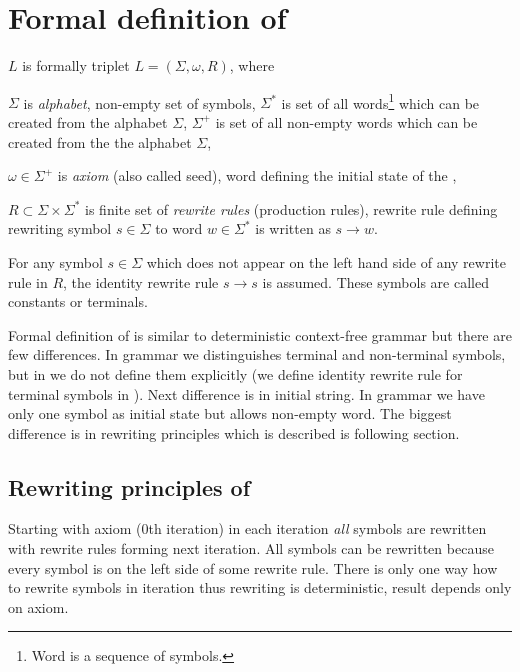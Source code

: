
\section{Formal definition of \lsystem}

\lsystem $L$ is formally triplet $L = (\Sigma, \omega, R)$, where

\begin{itemize*}
	\item $\Sigma$ is \emph{alphabet}, non-empty set of symbols, $\Sigma^{*}$ is set of all words\footnote{Word is a sequence of symbols.} which can be created from the alphabet $\Sigma$, $\Sigma^{+}$ is set of all non-empty words which can be created from the the alphabet $\Sigma$,
	\item $\omega \in \Sigma^{+}$ is \emph{axiom} (also called seed), word defining the initial state of the \lsystem,
	\item $R \subset \Sigma \times \Sigma^{*}$ is finite set of \emph{rewrite rules} (production rules), rewrite rule defining rewriting symbol $s \in \Sigma$ to word $w \in \Sigma^{*}$ is written as $s \rightarrow w$.
\end{itemize*}

For any symbol $s \in \Sigma$ which does not appear on the left hand side of any rewrite rule in $R$, the identity rewrite rule $s \rightarrow s$ is assumed.
These symbols are called constants or terminals.

Formal definition of \lsystem is similar to deterministic context-free grammar but there are few differences.
In grammar we distinguishes terminal and non-terminal symbols, but in \lsystems we do not define them explicitly (we define identity rewrite rule for terminal symbols in \lsystems).
Next difference is in initial string.
In grammar we have only one symbol as initial state but \lsystem allows non-empty word.
The biggest difference is in rewriting principles which is described is following section.


\subsection{Rewriting principles of \lsystem}

Starting with axiom (0th iteration) in each iteration \emph{all} symbols are rewritten with rewrite rules forming next iteration.
All symbols can be rewritten because every symbol is on the left side of some rewrite rule.
There is only one way how to rewrite symbols in iteration thus rewriting is deterministic, result depends only on axiom.

